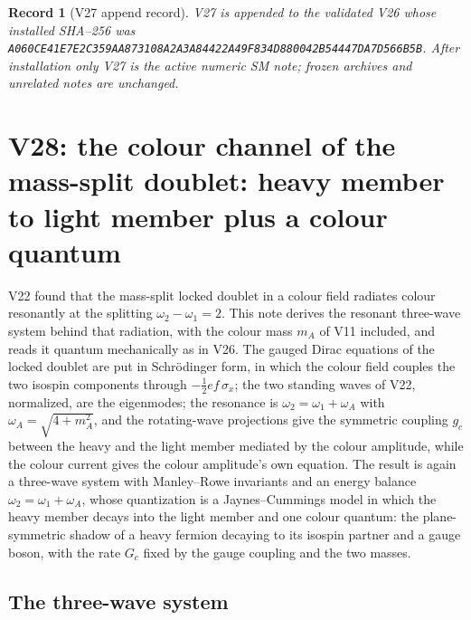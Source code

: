 \documentclass[11pt]{article}
\newtheorem{record}[theorem]{Record}
\theoremstyle{remark}
\begin{document}
\begin{record}[V27 append record]
\label{rec:v20v27}
V27 is appended to the validated V26 whose installed SHA--256 was
\texttt{A060CE41E7E2C359AA873108A2A3A84422A49F834D880042B54447DA7D566B5B}.
After installation only V27 is the active numeric SM note; frozen
archives and unrelated notes are unchanged.
\end{record}


\section{V28: the colour channel of the mass-split doublet: heavy member to light member plus a colour quantum}
\label{sec:v20v28}

V22 found that the mass-split locked doublet in a colour field
radiates colour resonantly at the splitting \(\omega_2-\omega_1=2\).
This note derives the resonant three-wave system behind that
radiation, with the colour mass \(m_A\) of V11 included, and reads it
quantum mechanically as in V26.  The gauged Dirac equations of the
locked doublet are put in Schr\"odinger form, in which the colour
field couples the two isospin components through
\(-\tfrac12ef\,\sigma_x\); the two standing waves of V22, normalized,
are the eigenmodes; the resonance is \(\omega_2=\omega_1+\omega_A\) with
\(\omega_A=\sqrt{4+m_A^2}\), and the rotating-wave projections give the
symmetric coupling \(g_c\) between the heavy and the light member
mediated by the colour amplitude, while the colour current gives the
colour amplitude's own equation.  The result is again a three-wave
system with Manley--Rowe invariants and an energy balance
\(\omega_2=\omega_1+\omega_A\), whose quantization is a Jaynes--Cummings
model in which the heavy member decays into the light member and one
colour quantum: the plane-symmetric shadow of a heavy fermion
decaying to its isospin partner and a gauge boson, with the rate
\(G_c\) fixed by the gauge coupling and the two masses.

\subsection{The three-wave system}
\end{document}
